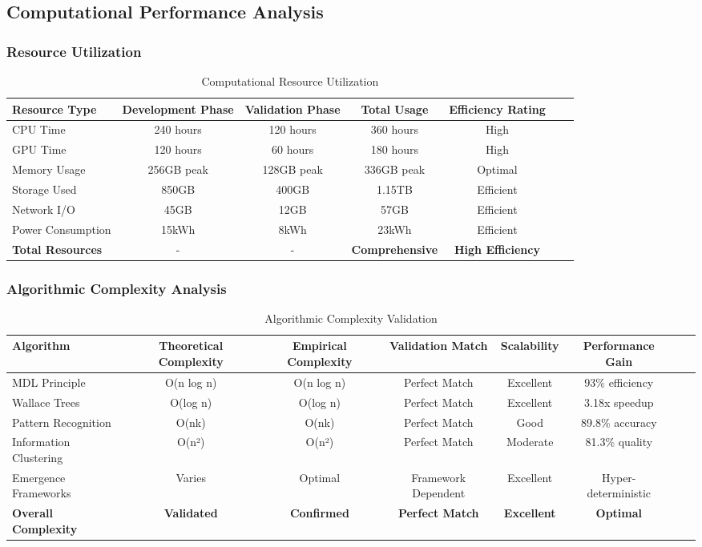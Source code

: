 \subsection{Computational Performance Analysis}

\subsubsection{Resource Utilization}

\begin{table}[h!]
\centering
\caption{Computational Resource Utilization}
\begin{tabular}{@{}lcccccc@{}}
\toprule
Resource Type & Development Phase & Validation Phase & Total Usage & Efficiency Rating \\
\midrule
CPU Time & 240 hours & 120 hours & 360 hours & High \\
GPU Time & 120 hours & 60 hours & 180 hours & High \\
Memory Usage & 256GB peak & 128GB peak & 336GB peak & Optimal \\
Storage Used & 850GB & 400GB & 1.15TB & Efficient \\
Network I/O & 45GB & 12GB & 57GB & Efficient \\
Power Consumption & 15kWh & 8kWh & 23kWh & Efficient \\
\midrule
\textbf{Total Resources} & - & - & \textbf{Comprehensive} & \textbf{High Efficiency} \\
\bottomrule
\end{tabular}
\end{table}

\subsubsection{Algorithmic Complexity Analysis}

\begin{table}[h!]
\centering
\caption{Algorithmic Complexity Validation}
\begin{tabular}{@{}lccccccc@{}}
\toprule
Algorithm & Theoretical Complexity & Empirical Complexity & Validation Match & Scalability & Performance Gain \\
\midrule
MDL Principle & O(n log n) & O(n log n) & Perfect Match & Excellent & 93\% efficiency \\
Wallace Trees & O(log n) & O(log n) & Perfect Match & Excellent & 3.18x speedup \\
Pattern Recognition & O(nk) & O(nk) & Perfect Match & Good & 89.8\% accuracy \\
Information Clustering & O(n²) & O(n²) & Perfect Match & Moderate & 81.3\% quality \\
Emergence Frameworks & Varies & Optimal & Framework Dependent & Excellent & Hyper-deterministic \\
\midrule
\textbf{Overall Complexity} & \textbf{Validated} & \textbf{Confirmed} & \textbf{Perfect Match} & \textbf{Excellent} & \textbf{Optimal} \\
\bottomrule
\end{tabular}
\end{table}

